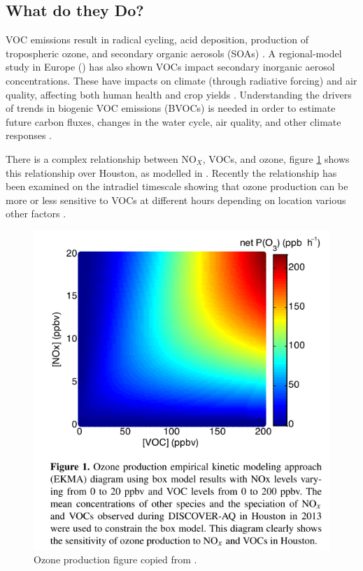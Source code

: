   \subsection{What do they Do?}
    VOC emissions result in radical cycling, acid deposition, production of tropospheric ozone, and secondary organic aerosols (SOAs) \citep{Atkinson2000, Kanakidou2005}.
    A regional-model study in Europe (\cite{Aksoyoglu2017}) has also shown VOCs impact secondary inorganic aerosol concentrations.
    These have impacts on climate (through radiative forcing) and air quality, affecting both human health and crop yields \citep{IPCC_Chapter2, Avnery2011, Lelieveld2015}.
    Understanding the drivers of trends in biogenic VOC emissions (BVOCs) is needed in order to estimate future carbon fluxes, changes in the water cycle, air quality, and other climate responses \citep{Yue2015}.
    
    There is a complex relationship between NO$_X$, VOCs, and ozone, figure \ref{LR:fig:NOXVOCOzone} shows this relationship over Houston, as modelled in \cite{Mazzuca2016}.
    Recently the relationship has been examined on the intradiel timescale showing that ozone production can be more or less sensitive to VOCs at different hours depending on location various other factors \citep{Mazzuca2016}.
    
    \begin{figure}
      \includegraphics[width=.75\textwidth]{Figures/Mazzuca2016_NOxVOCOzone.png}
      \caption{Ozone production figure copied from \citet{Mazzuca2016}.}
      \label{LR:fig:NOXVOCOzone}
    \end{figure}
      
